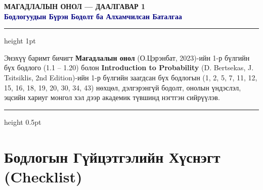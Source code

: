 \documentclass[11pt,a4paper]{article}
\begin{document}
\sloppy

\begin{center}
  \vspace*{0.2em}
  {\sffamily\bfseries\fontsize{20}{24}\selectfont МАГАДЛАЛЫН ОНОЛ — ДААЛГАВАР 1}\\[4pt]
  {\sffamily\normalsize\textcolor{navy}{\textbf{Бодлогуудын Бүрэн Бодолт ба Алхамчилсан Баталгаа}}}\\[8pt]
  {\color{navy}\hrule height 1pt}
\end{center}

\vspace{0.2em}
{\small
Энэхүү баримт бичигт \textbf{Магадлалын онол} (О.Цэрэнбат, 2023)-ийн 1-р бүлгийн бүх бодлого (1.1 -- 1.20) болон \textbf{Introduction to Probability} (D. Bertsekas, J. Tsitsiklis, 2nd Edition)-ийн 1-р бүлгийн заагдсан бүх бодлогын (1, 2, 5, 7, 11, 12, 15, 16, 18, 19, 20, 30, 34, 43) нөхцөл, дэлгэрэнгүй бодолт, онолын үндэслэл, эцсийн хариуг монгол хэл дээр академик түвшинд нэгтгэн сийрүүлэв.
}
\vspace{0.3em}
{\color{linegray}\hrule height 0.5pt}
\vspace{0.8em}

\section*{Бодлогын Гүйцэтгэлийн Хүснэгт (Checklist)}
\end{document}
